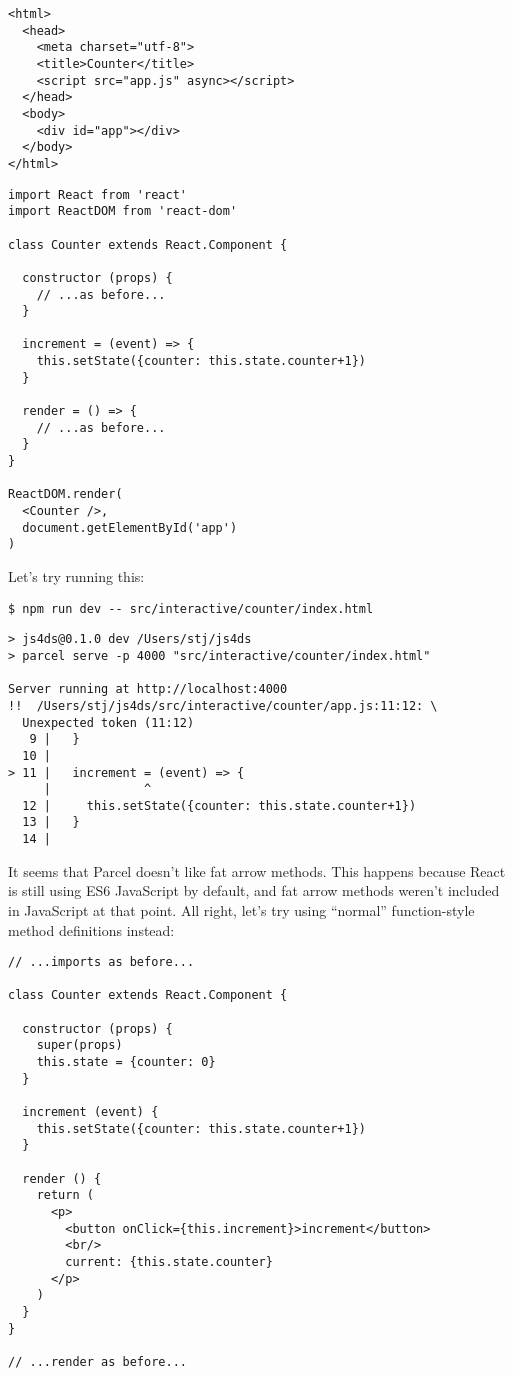 \begin{verbatim}
<html>
  <head>
    <meta charset="utf-8">
    <title>Counter</title>
    <script src="app.js" async></script>
  </head>
  <body>
    <div id="app"></div>
  </body>
</html>
\end{verbatim}

\begin{verbatim}
import React from 'react'
import ReactDOM from 'react-dom'

class Counter extends React.Component {

  constructor (props) {
    // ...as before...
  }

  increment = (event) => {
    this.setState({counter: this.state.counter+1})
  }

  render = () => {
    // ...as before...
  }
}

ReactDOM.render(
  <Counter />,
  document.getElementById('app')
)
\end{verbatim}

Let's try running this:

\begin{verbatim}
$ npm run dev -- src/interactive/counter/index.html
\end{verbatim}

\begin{verbatim}
> js4ds@0.1.0 dev /Users/stj/js4ds
> parcel serve -p 4000 "src/interactive/counter/index.html"

Server running at http://localhost:4000
!!  /Users/stj/js4ds/src/interactive/counter/app.js:11:12: \
  Unexpected token (11:12)
   9 |   }
  10 |
> 11 |   increment = (event) => {
     |             ^
  12 |     this.setState({counter: this.state.counter+1})
  13 |   }
  14 |
\end{verbatim}

It seems that Parcel doesn't like fat arrow methods.
This happens because React is still using ES6 JavaScript by default,
and fat arrow methods weren't included in JavaScript at that point.
All right, let's try using ``normal'' function-style method definitions instead:

\begin{verbatim}
// ...imports as before...

class Counter extends React.Component {

  constructor (props) {
    super(props)
    this.state = {counter: 0}
  }

  increment (event) {
    this.setState({counter: this.state.counter+1})
  }

  render () {
    return (
      <p>
        <button onClick={this.increment}>increment</button>
        <br/>
        current: {this.state.counter}
      </p>
    )
  }
}

// ...render as before...
\end{verbatim}

